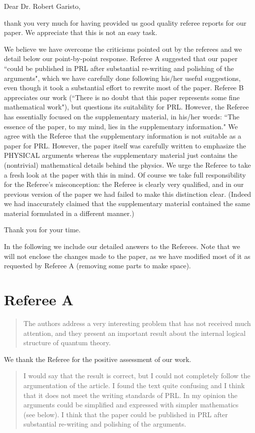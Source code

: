 \documentclass[11pt]{article}
\begin{document}
Dear Dr. Robert Garisto, 

thank you very much for having provided us
good quality referee reports for our paper. We appreciate that this is
not an easy task.

We believe we have overcome the criticisms pointed out by the referees
and we detail below our point-by-point response. Referee A suggested
that our paper ``could be published in PRL after substantial re-writing
and polishing of the arguments", which we have carefully done
following his/her useful suggestions, even though it took a
substantial effort to rewrite most of the paper. Referee B appreciates
our work (``There is no doubt that this paper represents some fine
mathematical work"), but questions its suitability for PRL. However,
the Referee has essentially focused on the supplementary material, in
his/her words: ``The essence of the paper, to my mind, lies in the
supplementary information." We agree with the Referee that the
supplementary information is not suitable as a paper for PRL. However,
the paper itself was carefully written to emphasize the PHYSICAL
arguments whereas the supplementary material just contains the
(nontrivial) mathematical details behind the physics. We urge the
Referee to take a fresh look at the paper with this in mind. Of course
we take full responsibility for the Referee's misconception: the
Referee is clearly very qualified, and in our previous version of the
paper we had failed to make this distinction clear. (Indeed we had
inaccurately claimed that the supplementary material contained the same
material formulated in a different manner.)

Thank you for your time. 

In the following we include our detailed answers to the Referees. Note 
that we will not enclose the changes made to
the paper, as we have modified most of it as requested by Referee A (removing some parts to make
space).


\section*{Referee A}

\begin{quote}
The authors address a very interesting problem that has
not received much attention, and they present an important result
about the internal logical structure of quantum theory.
\end{quote}

We thank the Referee for the positive assessment of our work.
\begin{quote}
I would say that the result is correct, but I could not
completely follow the argumentation of the article. I found the text
quite confusing and I think that it does not meet the writing
standards of PRL. In my opinion the arguments could be simplified and
expressed with simpler mathematics (see below). I think that the paper
could be published in PRL after substantial re-writing and polishing
of the arguments.
\end{quote}
\end{document}
